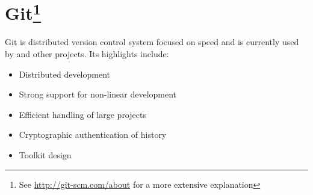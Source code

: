 
\section[Git]{Git\footnote{See \url{http://git-scm.com/about} for a more extensive explanation}}\label{sec:Git}

Git is distributed version control system focused on speed and is currently used by \GNOME and other projects. Its highlights include:

\begin{itemize}
  \item Distributed development
  \item Strong support for non-linear development
  \item Efficient handling of large projects
  \item Cryptographic authentication of history
  \item Toolkit design
\end{itemize}
